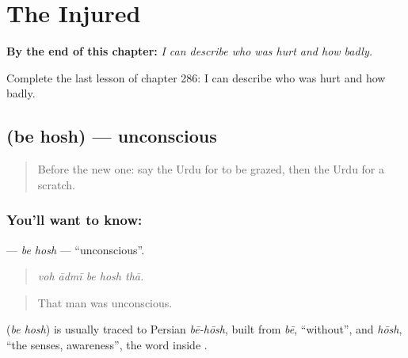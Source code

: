 
\chapter{The Injured}
\label{ch:ur-the-injured}

\begin{chapteropening}
\textbf{By the end of this chapter:} \emph{I can describe who was hurt and how badly.}

Complete the last lesson of chapter 286: I can describe who was hurt and how badly.
\end{chapteropening}

\section[\texorpdfstring{\ur{بے} \ur{ہوش} (be hosh)}{بے ہوش (be hosh)}]{  (be hosh) — unconscious}

\label{lesson:UR-C286-be-hosh}



\begin{quote}
Before the new one: say the Urdu for to be grazed, then the Urdu for a scratch.
\end{quote}

\subsection*{You'll want to know:  }
\textbf{ } — \emph{be hosh} — \textquotedblleft{}unconscious\textquotedblright{}.

\begin{quote}
    
\end{quote}

\begin{quote}
\emph{voh ādmī be hosh thā.}
\end{quote}

\begin{quote}
That man was unconscious.
\end{quote}

\begin{cousinweb}
\textbf{ } (\emph{be hosh}) is usually traced to Persian \emph{bē-hōsh}, built from \emph{bē}, \textquotedblleft{}without\textquotedblright{}, and \emph{hōsh}, \textquotedblleft{}the senses, awareness\textquotedblright{}, the word inside \textbf{}.
\end{cousinweb}

